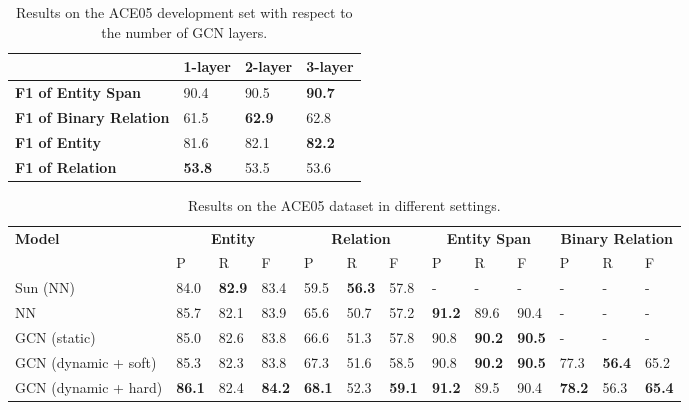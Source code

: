\begin{table}
	\centering
	\footnotesize
	\begin{tabular}{l|lll}
		\toprule
		 & 1-layer & 2-layer & 3-layer \\
        \midrule
        \textbf{F1 of Entity Span} & 90.4 & 90.5 & \textbf{90.7}\\
        \textbf{F1 of Binary Relation} & 61.5 & \textbf{62.9} & 62.8 \\
        \textbf{F1 of Entity} & 81.6 & 82.1 & \textbf{82.2}  \\
        \textbf{F1 of Relation} & \textbf{53.8} & 53.5 & 53.6 \\
		\bottomrule
	\end{tabular}
	\caption{\small Results on the ACE05 development set with respect to the number of GCN layers.}
	\label{tab:ace-gcn-layers}
\end{table}


\begin{table}
	\centering
	\footnotesize
	\begin{tabular}{l|lll|lll|lll|lll}
		\toprule
		\textbf{Model} & \multicolumn{3}{c}{\textbf{Entity}} & \multicolumn{3}{c}{\textbf{Relation}} &  \multicolumn{3}{c}{\textbf{Entity Span}} & \multicolumn{3}{c}{\textbf{Binary Relation}} \\
		& P & R & F & P & R & F & P & R & F & P & R & F \\
        \midrule
        Sun (NN) \citeyearpar{D18-1249} & 84.0 & \textbf{82.9} & 83.4 & 59.5 & \textbf{56.3} & 57.8 & - & - & - & - & - & - \\
        NN & 85.7 & 82.1 & 83.9 & 65.6 & 50.7 & 57.2 & \textbf{91.2} & 89.6 & 90.4 & - & - & - \\

        GCN (static) & 85.0 & 82.6 & 83.8 & 66.6 & 51.3 & 57.8 & 90.8 & \textbf{90.2} & \textbf{90.5} & - & - & - \\
        
        GCN (dynamic + soft)& 85.3 & 82.3 & 83.8 & 67.3 & 51.6 & 58.5 & 90.8 & \textbf{90.2} & \textbf{90.5} & 77.3 & \textbf{56.4} & 65.2 \\
        GCN (dynamic + hard)& \textbf{86.1} & 82.4 & \textbf{84.2} & \textbf{68.1} & 52.3 & \textbf{59.1} & \textbf{91.2} & 89.5 & 90.4 & \textbf{78.2} & 56.3 & \textbf{65.4} \\
		\bottomrule
	\end{tabular}
	\caption{\small Results on the ACE05 dataset in different settings.}
	\label{tab:framework-abla}
\end{table}



